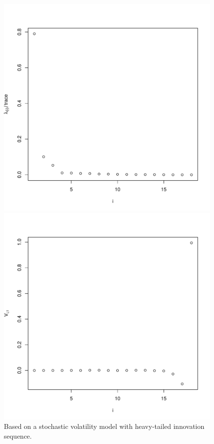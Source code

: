 \begin{figure}[htb]
  \centering
  \begin{minipage}{0.48\linewidth}
    \includegraphics[width=1.0\linewidth]{HeavyTailed_eigenvalues.pdf}
  \end{minipage}
  \begin{minipage}{0.48\linewidth}
    \includegraphics[width=1.0\linewidth]{HeavyTailed_eigenvector1.pdf}      
  \end{minipage}
  \caption{Based on a stochastic volatility model with heavy-tailed
    innovation sequence.}
  \label{eigen:model1}
\end{figure}

